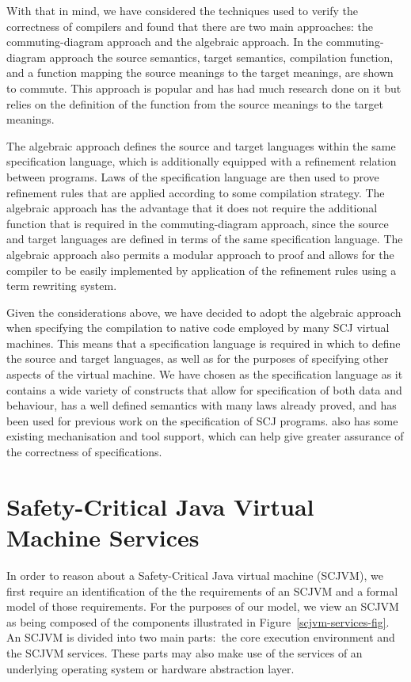 \documentclass[a4paper,10pt]{report}
\begin{document}
With that in mind, we have considered the techniques used to verify
the correctness of compilers and found that there are two main
approaches: the commuting-diagram approach and the algebraic approach.
In the commuting-diagram approach the source semantics, target
semantics, compilation function, and a function mapping the source
meanings to the target meanings, are shown to commute.
This approach is popular and has had much research done on it but
relies on the definition of the function from the source meanings to
the target meanings.

The algebraic approach defines the source and target languages within
the same specification language, which is additionally equipped with a
refinement relation between programs.
Laws of the specification language are then used to prove refinement
rules that are applied according to some compilation strategy.
The algebraic approach has the advantage that it does not require the
additional function that is required in the commuting-diagram
approach, since the source and target languages are defined in terms
of the same specification language.
The algebraic approach also permits a modular approach to proof and
allows for the compiler to be easily implemented by application of the
refinement rules using a term rewriting system.

Given the considerations above, we have decided to adopt the algebraic
approach when specifying the compilation to native code employed by
many SCJ virtual machines.
This means that a specification language is required in which to
define the source and target languages, as well as for the purposes of
specifying other aspects of the virtual machine.
We have chosen \Circus{} as the specification language as it contains
a wide variety of constructs that allow for specification of both data
and behaviour, has a well defined semantics with many laws already
proved, and has been used for previous work on the specification of
SCJ programs.
\Circus{} also has some existing mechanisation and tool support, which
can help give greater assurance of the correctness of specifications.

\chapter{Safety-Critical Java Virtual Machine Services}
\label{scjvm-services-chapter}

In order to reason about a Safety-Critical Java virtual machine
(SCJVM), we first require an identification of the the requirements of
an SCJVM and a formal model of those requirements.
For the purposes of our model, we view an SCJVM as being composed of
the components illustrated in Figure~\ref{scjvm-services-fig}.
An SCJVM is divided into two main parts:~the core execution
environment and the SCJVM services.
These parts may also make use of the services of an underlying
operating system or hardware abstraction layer.
\end{document}
